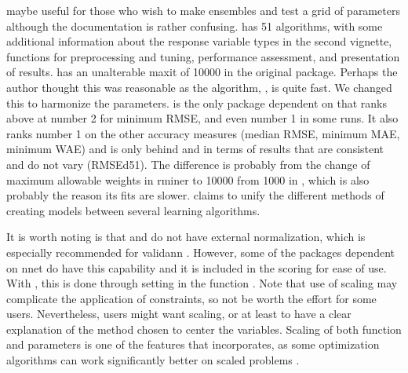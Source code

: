  \citep{R-EnsembleBase} maybe useful for those who
wish to make ensembles and test a grid of parameters although the
documentation is rather confusing. 
\citep{R-MachineShop} has 51 algorithms, with some additional
information about the response variable types in the second vignette,
functions for preprocessing and tuning, performance assessment, and
presentation of results.  \citep{R-radiant.model}
has an unalterable maxit of 10000 in the original package. Perhaps the
author thought this was reasonable as the algorithm, , is
quite fast. We changed this to harmonize the parameters.
 \citep{R-rminer} is the only package dependent on
 that ranks above  at number 2 for minimum
RMSE, and even number 1 in some runs. It also ranks number 1 on the
other accuracy measures (median RMSE, minimum MAE, minimum WAE) and is
only behind  and  in terms of
results that are consistent and do not vary (RMSEd51). The difference is
probably from the change of maximum allowable weights in rminer to 10000
from 1000 in , which is also probably the reason its fits
are slower.  \citep{R-traineR} claims to unify the
different methods of creating models between several learning
algorithms.

It is worth noting is that  and  do not
have external normalization, which is especially recommended for
validann . However, some of the packages dependent on nnet do have this
capability and it is included in the scoring for ease of use. With
, this is done through setting  in
the function . Note that use of scaling may complicate
the application of constraints, so not be worth the effort for some
users. Nevertheless, users might want scaling, or at least to have a
clear explanation of the method chosen to center the variables. Scaling
of both function and parameters is one of the features that
 \citep{R-optimx} incorporates, as some optimization
algorithms can work significantly better on scaled problems
\citep{Nash-nlpor14}.

